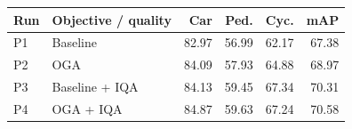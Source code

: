\begin{tabular}{llrrrr}
\toprule
Run & Objective / quality & Car & Ped. & Cyc. & mAP \\
\midrule
P1 & Baseline & 82.97 & 56.99 & 62.17 & 67.38 \\
P2 & OGA & 84.09 & 57.93 & 64.88 & 68.97 \\
P3 & Baseline + IQA & 84.13 & 59.45 & 67.34 & 70.31 \\
P4 & OGA + IQA & 84.87 & 59.63 & 67.24 & 70.58 \\
\bottomrule
\end{tabular}
